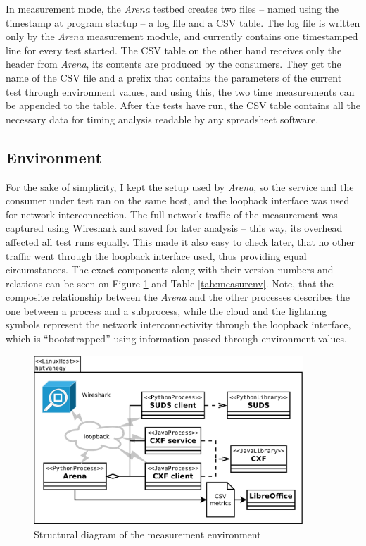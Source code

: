 \noindent
In measurement mode, the \emph{Arena} testbed creates two files -- named using the timestamp at program startup -- a log file and a CSV table. The log file is written only by the \emph{Arena} measurement module, and currently contains one timestamped line for every test started. The CSV table on the other hand receives only the header from \emph{Arena}, its contents are produced by the consumers. They get the name of the CSV file and a prefix that contains the parameters of the current test through environment values, and using this, the two time measurements can be appended to the table. After the tests have run, the CSV table contains all the necessary data for timing analysis readable by any spreadsheet software.

\subsection{Environment}

For the sake of simplicity, I kept the setup used by \emph{Arena}, so the service and the consumer under test ran on the same host, and the loopback interface was used for network interconnection. The full network traffic of the measurement was captured using Wireshark and saved for later analysis -- this way, its overhead affected all test runs equally. This made it also easy to check later, that no other traffic went through the loopback interface used, thus providing equal circumstances. The exact components along with their version numbers and relations can be seen on Figure \ref{fig:measurenv} and Table \ref{tab:measurenv}. Note, that the composite relationship between the \emph{Arena} and the other processes describes the one between a process and a subprocess, while the cloud and the lightning symbols represent the network interconnectivity through the loopback interface, which is ``bootstrapped'' using information passed through environment values.

\begin{figure}[htbp]
 \centering
 \includegraphics[width=0.9\textwidth]{images/measurenv.pdf}
 \caption{Structural diagram of the measurement environment}
 \label{fig:measurenv}
\end{figure}

